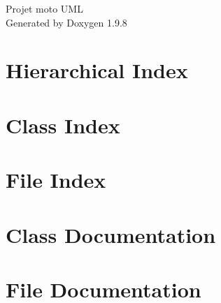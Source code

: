 \documentclass[twoside]{book}
\newcommand{\+}{\discretionary{\mbox{\scriptsize$\hookleftarrow$}}{}{}}
\newcommand{\clearemptydoublepage}{%
    \newpage{\pagestyle{empty}\cleardoublepage}%
  }
\begin{document}
  \raggedbottom
    \hypersetup{pageanchor=false,
                bookmarksnumbered=true,
                pdfencoding=unicode
               }
  \begin{titlepage}
  \vspace*{7cm}
  \begin{center}%
  {\Large Projet moto UML}\\
  \vspace*{1cm}
  {\large Generated by Doxygen 1.9.8}\\
  \end{center}
  \end{titlepage}
  \clearemptydoublepage
  \tableofcontents
  \clearemptydoublepage
  \hypersetup{pageanchor=true}
\chapter{Hierarchical Index}

\chapter{Class Index}

\chapter{File Index}

\chapter{Class Documentation}





\chapter{File Documentation}
















  \backmatter
  \newpage
  \clearemptydoublepage
  \printindex
\end{document}
